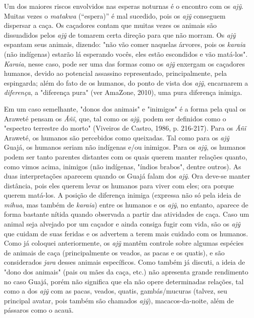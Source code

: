 Um dos maiores riscos envolvidos nas esperas noturnas é o encontro com
os \emph{ajỹ}. Muitas vezes o \emph{matakwa} (``espera)'' é mal
sucedido, pois os \emph{ajỹ} conseguem dispersar a caça. Os caçadores
contam que muitas vezes os animais são dissuadidos pelos \emph{ajỹ} de
tomarem certa direção para que não morram. Os \emph{ajỹ} espantam seus
animais, dizendo: "não vão comer naquelas árvores, pois os \emph{karaia}
(não indígenas) estarão lá esperando vocês, eles estão escondidos e vão
matá-los". \emph{Karaia}, nesse caso, pode ser uma das formas como os
\emph{ajỹ} enxergam os caçadores humanos, devido ao potencial assassino
representado, principalmente, pela espingarda; além do fato de os
humanos, do ponto de vista dos \emph{ajỹ}, encarnarem a
\emph{diferença}, a "diferença pura" (ver AmaZone, 2010), uma pura
diferença inimiga.

Em um caso semelhante, "donos dos animais" e "inimigos" é a forma pela
qual os Araweté pensam os \emph{Ãñĩ}, que, tal como os \emph{ajỹ}, podem
ser definidos como o "espectro terrestre do morto" (Viveiros de Castro,
1986, p. 216-217). Para os \emph{Ãñĩ} Araweté, os humanos são percebidos
como queixadas. Tal como para os \emph{ajỹ} Guajá, os humanos seriam não
indígenas e/ou inimigos. Para os \emph{ajỹ}, os humanos podem ser tanto
parentes distantes com os quais querem manter relações quanto, como
vimos acima, inimigos (não indígenas, "índios brabos", dentre outros).
As duas interpretações aparecem quando os Guajá falam dos \emph{ajỹ}.
Ora deve-se manter distância, pois eles querem levar os humanos para
viver com eles; ora porque querem matá-los. A posição de diferença
inimiga (expressa não só pela ideia de \emph{mihua}, mas também de
\emph{karaia}) entre os humanos e os \emph{ajỹ}, no entanto, aparece de
forma bastante nítida quando observada a partir das atividades de caça.
Caso um animal seja alvejado por um caçador e ainda consiga fugir com
vida, são os \emph{ajỹ} que cuidam de suas feridas e os advertem a terem
mais cuidado com os humanos. Como já coloquei anteriormente, os
\emph{ajỹ} mantêm controle sobre algumas espécies de animais de caça
(principalmente os veados, as pacas e os quatis), e são considerados
\emph{jara} desses animais específicos. Como também já discuti, a ideia
de "dono dos animais" (pais ou mães da caça, etc.) não apresenta grande
rendimento no caso Guajá, porém não significa que ela não opere
determinadas relações, tal como a dos \emph{ajỹ} com as pacas, veados,
quatis, gambás/mucuras (talvez, seu principal avatar, pois também são
chamados \emph{ajỹ}), macacos-da-noite, além de pássaros como o acauã.

